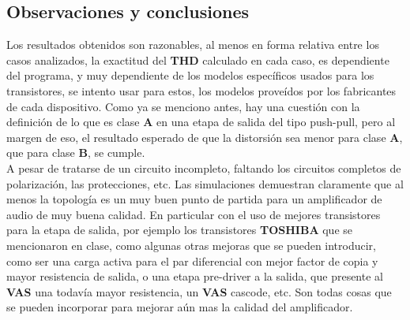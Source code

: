 
\subsection{Observaciones y conclusiones}

Los resultados obtenidos son razonables, al menos en forma relativa entre los casos analizados, la exactitud del \textbf{THD} calculado en cada caso, es dependiente del programa, y muy dependiente de los modelos específicos usados para los transistores, se intento usar para estos, los modelos proveídos por los fabricantes de cada dispositivo. Como ya se menciono antes, hay una cuestión con la definición de lo que es clase \textbf{A} en una etapa de salida del tipo push-pull, pero al margen de eso, el resultado esperado de que la distorsión sea menor para clase \textbf{A}, que para clase \textbf{B}, se cumple. \\
A pesar de tratarse de un circuito incompleto, faltando los circuitos completos de polarización, las protecciones, etc. Las simulaciones demuestran claramente que al menos la topología es un muy buen punto de partida para un amplificador de audio de muy buena calidad. En particular con el uso de mejores transistores para la etapa de salida, por ejemplo los transistores \textbf{TOSHIBA} que se mencionaron en clase, como algunas otras mejoras que se pueden introducir, como ser una carga activa para el par diferencial con mejor factor de copia y mayor resistencia de salida, o una etapa pre-driver a la salida, que presente al \textbf{VAS} una todavía mayor resistencia, un \textbf{VAS} cascode, etc. Son todas cosas que se pueden incorporar para mejorar aún mas la calidad del amplificador.

